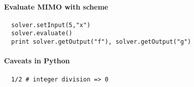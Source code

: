 \documentclass[a4paper,8pt]{article}
\begin{document}
\begin{multicols}{2}
\paragraph{Evaluate MIMO with scheme}
\begin{verbatim}
  solver.setInput(5,"x")
  solver.evaluate()
  print solver.getOutput("f"), solver.getOutput("g")
\end{verbatim}

\paragraph{Caveats in Python}
\begin{verbatim}
  1/2 # integer division => 0
\end{verbatim}
\end{multicols}
\end{document}
